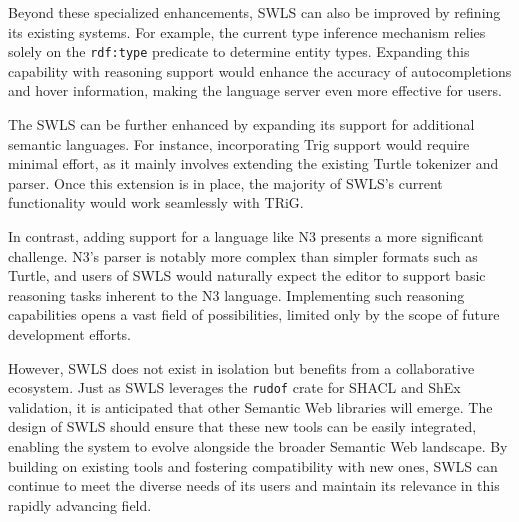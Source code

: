 Beyond these specialized enhancements, SWLS can also be improved by refining its existing systems.
For example, the current type inference mechanism relies solely on the \texttt{rdf:type} predicate to determine entity types.
Expanding this capability with reasoning support would enhance the accuracy of autocompletions and hover information, making the language server even more effective for users.

The SWLS can be further enhanced by expanding its support for additional semantic languages.
For instance, incorporating Trig support would require minimal effort, as it mainly involves extending the existing Turtle tokenizer and parser.
Once this extension is in place, the majority of SWLS’s current functionality would work seamlessly with TRiG.

In contrast, adding support for a language like N3 presents a more significant challenge.
N3’s parser is notably more complex than simpler formats such as Turtle, and users of SWLS would naturally expect the editor to support basic reasoning tasks inherent to the N3 language.
Implementing such reasoning capabilities opens a vast field of possibilities, limited only by the scope of future development efforts.

However, SWLS does not exist in isolation but benefits from a collaborative ecosystem.
Just as SWLS leverages the \texttt{rudof} crate for SHACL and ShEx validation, it is anticipated that other Semantic Web libraries will emerge.
The design of SWLS should ensure that these new tools can be easily integrated, enabling the system to evolve alongside the broader Semantic Web landscape.
By building on existing tools and fostering compatibility with new ones, SWLS can continue to meet the diverse needs of its users and maintain its relevance in this rapidly advancing field.


